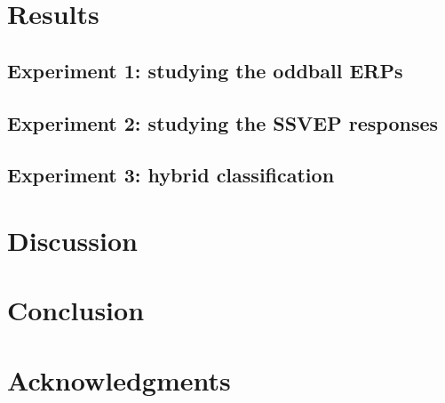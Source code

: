 \documentclass[10pt]{article}
\begin{document}
\section{Results}
\label{sec:3Results}

    \subsection{Experiment 1: studying the oddball ERPs}
    \label{sec:2.2Oddball}


    \subsection{Experiment 2: studying the SSVEP responses}
    \label{sec:2.3SSVEP}


    \subsection{Experiment 3: hybrid classification}
    \label{sec:2.4Hybrid}


\section{Discussion}
\label{sec:4Discuss}

\section{Conclusion}
\label{sec:6Conclusion}

\section*{Acknowledgments}

\printbibliography

%


\end{document}
